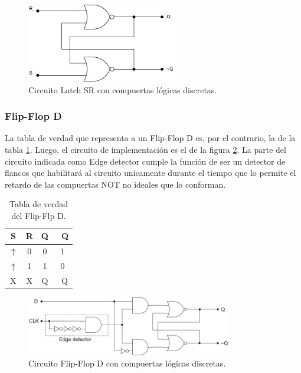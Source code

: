 \begin{figure}[H]
    \centering
    \includegraphics[width=0.6\textwidth]{../EJ6/Recursos/latch_sr_with_gates}
    \caption{Circuito Latch SR con compuertas lógicas discretas.}
    \label{fig:latch_sr_with_gates_ex6}
\end{figure}


\subsubsection{Flip-Flop D}
La tabla de verdad que representa a un Flip-Flop D es, por el contrario, la de la tabla \ref{table:ffd_truth_table_ex6}.
Luego, el circuito de implementación es el de la figura \ref{fig:ffd_with_gates_ex6}.
La parte del circuito indicada como Edge detector cumple la función de ser un detector de flancos que habilitará al circuito unicamente durante el tiempo que lo permite 
el retardo de las compuertas NOT no ideales que lo conforman.

\begin{table}[H]
    \centering
    \begin{tabular}{cc|cc}
    \textbf{S}   & \textbf{R} & \textbf{Q} & \textbf{~Q} \\ \hline
    $\uparrow$   & 0          & 0          & 1           \\
    $\uparrow$   & 1          & 1          & 0           \\
    X            & X          & Q          & ~Q         
    \end{tabular}
    \caption{Tabla de verdad del Flip-Flp D.}
    \label{table:ffd_truth_table_ex6}
\end{table}

\begin{figure}[H]
    \centering
    \includegraphics[width=0.8\textwidth]{../EJ6/Recursos/ffd_with_gates}
    \caption{Circuito Flip-Flop D con compuertas lógicas discretas.}
    \label{fig:ffd_with_gates_ex6}
\end{figure}



